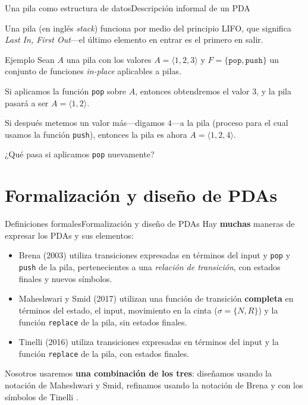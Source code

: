 \documentclass[spanish]{beamer}
\begin{document}
\begin{frame}{Una pila como estructura de datos}{Descripción informal de un PDA}

    Una \alert{pila} (en inglés \textit{stack}) funciona por medio del principio \alert{LIFO}, que significa \textit{Last In, First Out}---el último elemento en entrar es el primero en salir. \pause

    \bigskip

    \begin{exampleblock}{Ejemplo}
        Sean $A$ una pila con los valores $A = \langle 1, 2, 3 \rangle$ y $F = \{\mathtt{pop}, \mathtt{push}\}$ un conjunto de funciones \textit{in-place} aplicables a pilas.
    \end{exampleblock} \pause

    \bigskip

    Si aplicamos la función \texttt{pop} sobre $A$, entonces obtendremos el valor $3$, y la pila pasará a ser $A = \langle 1,2 \rangle$. \pause

    \bigskip
    
    Si después metemos un valor más---digamos $4$---a la pila (proceso para el cual usamos la función \texttt{push}), entonces la pila es ahora $A = \langle 1, 2, 4 \rangle$. \pause

    \bigskip
    
    ¿Qué pasa si aplicamos \texttt{pop} nuevamente?
\end{frame}

\section{Formalización y diseño de PDAs}

\begin{frame}{Definiciones formales}{Formalización y diseño de PDAs}
    Hay \textbf{muchas} maneras de expresar los PDAs y sus elementos: \pause
    \begin{itemize}
        \itemsep1.5ex
        \item Brena (2003) utiliza transiciones expresadas en términos del input y \texttt{pop} y \texttt{push} de la pila, pertenecientes a una \textit{relación de transición}, con estados finales y nuevos símbolos. \pause
        \item Maheshwari y Smid (2017) utilizan una función de transición \textbf{completa} en términos del estado, el input, movimiento en la cinta ($\sigma = \{N,R\}$) y la función \texttt{replace} de la pila, sin estados finales. \pause
        \item Tinelli (2016) utiliza transiciones expresadas en términos del input y la función \texttt{replace} de la pila, con estados finales. 
    \end{itemize} \pause

    \bigskip

    Nosotros usaremos \textbf{una combinación de los tres}: diseñamos usando la notación de Maheshwari y Smid, refinamos usando la notación de Brena y con los símbolos de Tinelli .
\end{frame}
\end{document}
